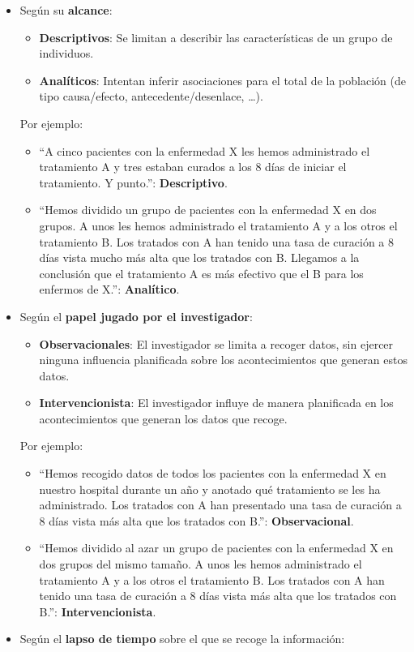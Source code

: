 \documentclass[
]{book}
\providecommand{\tightlist}{%
  \setlength{\itemsep}{0pt}\setlength{\parskip}{0pt}}
\theoremstyle{definition}
\theoremstyle{definition}
\theoremstyle{definition}
\theoremstyle{definition}
\theoremstyle{remark}
\begin{document}
\begin{itemize}
\item
  Según su \textbf{alcance}:

  \begin{itemize}
  \item
    \textbf{Descriptivos}: Se limitan a describir las características de un grupo de individuos.
  \item
    \textbf{Analíticos}: Intentan inferir asociaciones para el total de la población (de tipo causa/efecto, antecedente/desenlace, \ldots).
  \end{itemize}

  Por ejemplo:

  \begin{itemize}
  \tightlist
  \item
    ``A cinco pacientes con la enfermedad X les hemos administrado el tratamiento A y tres estaban curados a los 8 días de iniciar el tratamiento. Y punto.'': \textbf{Descriptivo}.
  \item
    ``Hemos dividido un grupo de pacientes con la enfermedad X en dos grupos. A unos les hemos administrado el tratamiento A y a los otros el tratamiento B. Los tratados con A han tenido una tasa de curación a 8 días vista mucho más alta que los tratados con B. Llegamos a la conclusión que el tratamiento A es más efectivo que el B para los enfermos de X.'': \textbf{Analítico}.
  \end{itemize}
\item
  Según el \textbf{papel jugado por el investigador}:

  \begin{itemize}
  \item
    \textbf{Observacionales}: El investigador se limita a recoger datos, sin ejercer ninguna influencia planificada sobre los acontecimientos que generan estos datos.
  \item
    \textbf{Intervencionista}: El investigador influye de manera planificada en los acontecimientos que generan los datos que recoge.
  \end{itemize}

  Por ejemplo:

  \begin{itemize}
  \tightlist
  \item
    ``Hemos recogido datos de todos los pacientes con la enfermedad X en nuestro hospital durante un año y anotado qué tratamiento se les ha administrado. Los tratados con A han presentado una tasa de curación a 8 días vista más alta que los tratados con B.'': \textbf{Observacional}.
  \item
    ``Hemos dividido al azar un grupo de pacientes con la enfermedad X en dos grupos del mismo tamaño. A unos les hemos administrado el tratamiento A y a los otros el tratamiento B. Los tratados con A han tenido una tasa de curación a 8 días vista más alta que los tratados con B.'': \textbf{Intervencionista}.
  \end{itemize}
\item
  Según el \textbf{lapso de tiempo} sobre el que se recoge la información:


\end{itemize}
\end{document}
